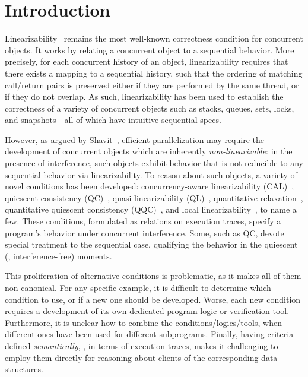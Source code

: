

\section{Introduction}
\label{sec:introduction}

Linearizability~\cite{Herlihy-Wing:TOPLAS90} remains the
most well-known correctness condition for concurrent objects.
% 
It works by relating a concurrent object to a sequential behavior.
More precisely, for each concurrent history of an object,
linearizability requires that there exists a mapping to a sequential
history, such that the ordering of matching call/return pairs is
preserved either if they are performed by the same thread, or if they
do not overlap.
%
As such, linearizability has been used to establish the correctness of
a variety of concurrent objects such as stacks, queues, sets, locks,
and snapshots---all of which have intuitive sequential specs.
%

However, as argued by Shavit~\cite{Shavit:CACM11}, efficient
parallelization may require the development of concurrent objects
which are inherently \emph{non-linearizable}: in the presence of
interference, such objects exhibit behavior that is not reducible to
any sequential behavior via linearizability. To reason about such
objects, a variety of novel conditions has been developed:
concurrency-aware linearizability (CAL)~\cite{Hemed-Rinetzky:PODC14},
quiescent consistency (QC)~\cite{Aspnes-al:JACM94,Derrick-al:FM14},
quasi-linearizability (QL)~\cite{Afek-al:OPODIS10}, quantitative
relaxation~\cite{Henzinger-al:POPL13}, quantitative quiescent
consistency (QQC)~\cite{Jagadeesan-Riely:ICALP14}, and local
linearizability~\cite{Haas-al-local15}, to name a few.
%
These conditions, formulated as relations on execution traces, specify
a program's behavior under concurrent interference. Some, such as QC,
devote special treatment to the sequential case, qualifying the
behavior in the quiescent (\ie, interference-free) moments.
%

This proliferation of alternative conditions is problematic, as it
makes all of them non-canonical. For any specific example, it is
difficult to determine which condition to use, or if a new one should
be developed. Worse, each new condition requires a development of its
own dedicated program logic or verification tool. Furthermore, it is
unclear how to combine the conditions/logics/tools, when different
ones have been used for different subprograms.
%
Finally, having criteria defined \emph{semantically}, \eg, in terms of
execution traces, makes it challenging to employ them directly for
reasoning about clients of the corresponding data structures.

